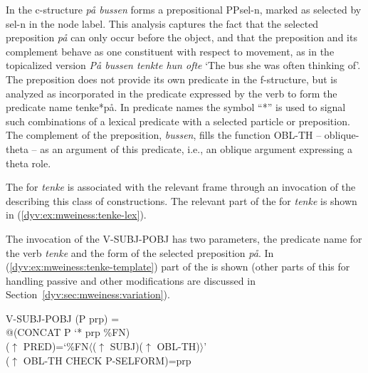 \documentclass[output=paper]{langsci/langscibook}
\begin{document}
In the c-structure \textit{på bussen} forms a prepositional  \textsf{PPsel-n}, marked as selected by \textsf{sel-n} in the node label.
This analysis captures the fact that the selected preposition \textit{på} can only occur before the object, and that the preposition and its complement behave as one constituent with respect to movement, as in the topicalized version \textit{På bussen tenkte hun ofte} `The bus she was often thinking of'.
The preposition does not provide its own predicate in the f-structure, but is analyzed as incorporated in the predicate expressed by the verb to form the predicate name \textsf{tenke*på}.
In predicate names the symbol ``\textsf{*}'' is used to signal such combinations of a lexical predicate with a selected particle or preposition.
The complement of the preposition, \textit{bussen}, fills the function \textsf{OBL-TH} -- oblique-theta -- as an argument of this predicate, i.e., an oblique argument expressing a theta role.

The  for \textit{tenke} is associated with the relevant frame through an invocation of the  describing this class of constructions.
The relevant part of the  for \textit{tenke} is shown in  (\ref{dyv:ex:mweiness:tenke-lex}).


The invocation of the  \textsf{V-SUBJ-POBJ} has two parameters, the predicate name for the verb \textit{tenke} and the form of the selected preposition \textit{på}.
In (\ref{dyv:ex:mweiness:tenke-template}) part of the  is shown (other parts of this  for handling passive and other modifications are discussed in Section~\ref{dyv:sec:mweiness:variation}).

\ea\label{dyv:ex:mweiness:tenke-template}
{\sffamily 
V-SUBJ-POBJ (P prp) =\\
\hspace{2em} @(CONCAT P `* prp \%FN)\\
\hspace{2em}  ($\uparrow$ PRED)=`\%FN$\langle$($\uparrow$ SUBJ)($\uparrow$ OBL-TH)$\rangle$'\\
\hspace{2em}  ($\uparrow$ OBL-TH CHECK P-SELFORM)=prp
}
\z
\end{document}
